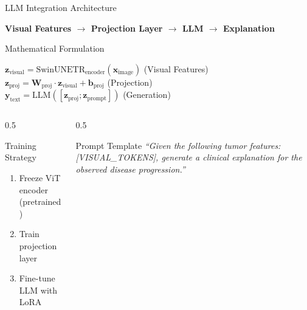 \documentclass[aspectratio=169]{beamer}
\begin{document}
\begin{frame}{LLM Integration Architecture}
    \begin{center}
        \Large
        \textbf{Visual Features $\rightarrow$ Projection Layer $\rightarrow$ LLM $\rightarrow$ Explanation}
    \end{center}
    
    \vspace{1em}
    
    \begin{block}{Mathematical Formulation}
        \begin{center}
            $\mathbf{z}_{\text{visual}} = \text{SwinUNETR}_{\text{encoder}}(\mathbf{x}_{\text{image}})$ \hspace{1em} (Visual Features) \\
            \vspace{0.5em}
            $\mathbf{z}_{\text{proj}} = \mathbf{W}_{\text{proj}} \cdot \mathbf{z}_{\text{visual}} + \mathbf{b}_{\text{proj}}$ \hspace{1em} (Projection) \\
            \vspace{0.5em}
            $\mathbf{y}_{\text{text}} = \text{LLM}([\mathbf{z}_{\text{proj}}; \mathbf{z}_{\text{prompt}}])$ \hspace{1em} (Generation)
        \end{center}
    \end{block}
    
    \begin{columns}
        \begin{column}{0.5\textwidth}
            \begin{block}{Training Strategy}
                \begin{enumerate}
                    \item Freeze ViT encoder (pretrained)
                    \item Train projection layer
                    \item Fine-tune LLM with LoRA
                \end{enumerate}
            \end{block}
        \end{column}
        \begin{column}{0.5\textwidth}
            \begin{block}{Prompt Template}
                \textit{``Given the following tumor features: [VISUAL\_TOKENS], generate a clinical explanation for the observed disease progression.''}
            \end{block}
        \end{column}
    \end{columns}
\end{frame}
\end{document}
